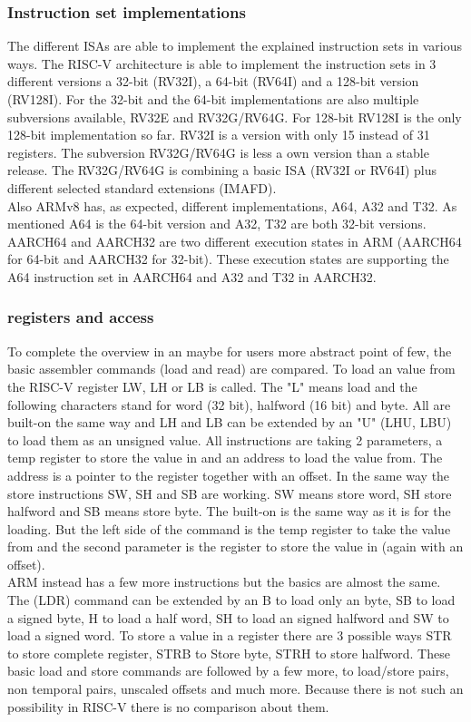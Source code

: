 \documentclass[conference]{IEEEtran}
\begin{document}
\subsubsection{Instruction set implementations}
The different \glspl{ISA} are able to implement the explained instruction sets in various ways.
The RISC-V architecture is able to implement the instruction sets in 3 different versions a 32-bit (RV32I), a 64-bit (RV64I) and a 128-bit version (RV128I).
For the 32-bit and the 64-bit implementations are also multiple subversions available, RV32E and RV32G/RV64G. For 128-bit RV128I is the only 128-bit implementation so far. RV32I is a version with only 15 instead of 31 registers. The subversion RV32G/RV64G is less a own version than a stable release. The RV32G/RV64G is combining a basic \gls{ISA} (RV32I or RV64I) plus different selected standard extensions (IMAFD). \cite{Asanovic2016} \\
Also ARMv8 has, as expected, different implementations,
A64, A32 and T32. As mentioned A64 is the 64-bit version and A32, T32  are both 32-bit versions.
AARCH64 and AARCH32 are two different execution states in ARM (AARCH64 for 64-bit and AARCH32 for 32-bit). These execution states are supporting the A64 instruction set in AARCH64 and A32 and T32 in AARCH32.\cite{ArmManual}\\

\subsubsection{registers and access}
To complete the overview in an maybe for users more abstract point of few, the basic assembler commands (load and read) are compared.
To load an value from the RISC-V register LW, LH or LB is called. The "L" means load and the following characters stand for word (32 bit), halfword (16 bit) and byte. All are built-on the same way and LH and LB can be extended by an "U" (LHU, LBU) to load them as an unsigned value. All instructions are taking 2 parameters, a temp register to store the value in and an address to load the value from. The address is a pointer to the register together with an offset.
In the same way the store instructions SW, SH and SB are working. SW means store word, SH store halfword and SB means store byte. The built-on is the same way as it is for the loading. But the left side of the command is the temp register to take the value from and the second parameter is the register to store the value in (again with an offset). \cite{Asanovic2016} \\
ARM instead has a few more instructions but the basics are almost the same. The (LDR) command can be extended by an B to load only an byte, SB to load a signed byte, H to load a half word, SH to load an signed halfword and SW to load a signed word. To store a value in a register there are 3 possible ways STR to store complete register, STRB to Store byte, STRH to store halfword. These basic load and store commands are followed by a few more, to load/store pairs, non temporal pairs, unscaled offsets and much more. Because there is not such an possibility in RISC-V there is no comparison about them. \cite{ArmManual}
\end{document}
